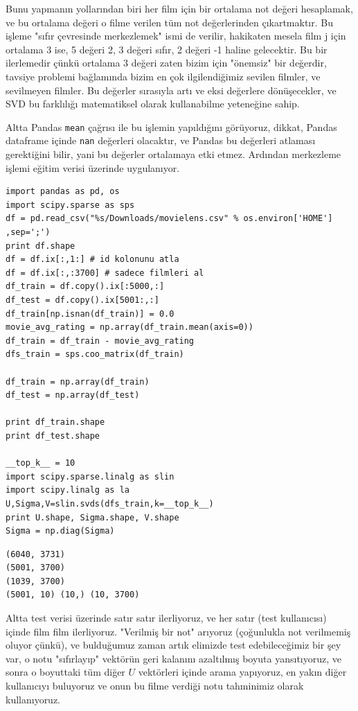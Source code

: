\documentclass[12pt,fleqn]{article}\usepackage{../../common}
\begin{document}
Bunu yapmanın yollarından biri her film için bir ortalama not değeri
hesaplamak, ve bu ortalama değeri o filme verilen tüm not
değerlerinden çıkartmaktır. Bu işleme "sıfır çevresinde merkezlemek"
ismi de verilir, hakikaten mesela film j için ortalama 3 ise, 5 değeri
2, 3 değeri sıfır, 2 değeri -1 haline gelecektir. Bu bir ilerlemedir
çünkü ortalama 3 değeri zaten bizim için "önemsiz" bir değerdir,
tavsiye problemi bağlamında bizim en çok ilgilendiğimiz sevilen
filmler, ve sevilmeyen filmler. Bu değerler sırasıyla artı ve eksi
değerlere dönüşecekler, ve SVD bu farklılığı matematiksel olarak
kullanabilme yeteneğine sahip.

Altta Pandas \verb!mean! çağrısı ile bu işlemin yapıldığını görüyoruz, dikkat,
Pandas dataframe içinde \verb!nan! değerleri olacaktır, ve Pandas bu değerleri
atlaması gerektiğini bilir, yani bu değerler ortalamaya etki etmez. Ardından
merkezleme işlemi eğitim verisi üzerinde uygulanıyor.

\begin{verbatim}
import pandas as pd, os
import scipy.sparse as sps
df = pd.read_csv("%s/Downloads/movielens.csv" % os.environ['HOME'] ,sep=';')
print df.shape
df = df.ix[:,1:] # id kolonunu atla
df = df.ix[:,:3700] # sadece filmleri al
df_train = df.copy().ix[:5000,:]
df_test = df.copy().ix[5001:,:]
df_train[np.isnan(df_train)] = 0.0
movie_avg_rating = np.array(df_train.mean(axis=0))
df_train = df_train - movie_avg_rating
dfs_train = sps.coo_matrix(df_train)

df_train = np.array(df_train)
df_test = np.array(df_test)

print df_train.shape
print df_test.shape

__top_k__ = 10
import scipy.sparse.linalg as slin
import scipy.linalg as la
U,Sigma,V=slin.svds(dfs_train,k=__top_k__)
print U.shape, Sigma.shape, V.shape
Sigma = np.diag(Sigma)
\end{verbatim}

\begin{verbatim}
(6040, 3731)
(5001, 3700)
(1039, 3700)
(5001, 10) (10,) (10, 3700)
\end{verbatim}

Altta test verisi üzerinde satır satır ilerliyoruz, ve her satır (test
kullanıcısı) içinde film film ilerliyoruz. "Verilmiş bir not" arıyoruz
(çoğunlukla not verilmemiş oluyor çünkü), ve bulduğumuz zaman artık
elimizde test edebileceğimiz bir şey var, o notu "sıfırlayıp" vektörün
geri kalanını azaltılmış boyuta yansıtıyoruz, ve sonra o boyuttaki tüm
diğer $U$ vektörleri içinde arama yapıyoruz, en yakın diğer
kullanıcıyı buluyoruz ve onun bu filme verdiği notu tahminimiz olarak
kullanıyoruz.
\end{document}
